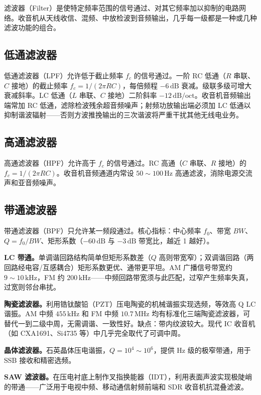 \documentclass[12pt,UTF8]{ctexbook}
\begin{document}
滤波器（Filter）是使特定频率范围的信号通过、对其它频率加以抑制的电路网络。收音机从天线收信、混频、中放检波到音频输出，几乎每一级都是一种或几种滤波功能的组合。

\subsection{低通滤波器}

低通滤波器（LPF）允许低于截止频率 $f_c$ 的信号通过。一阶 RC 低通（$R$ 串联、$C$ 接地）的截止频率 $f_c = 1/(2\pi RC)$，每倍频程 $-6\,\mathrm{dB}$ 衰减。级联多级可增大衰减斜率。LC 低通（$L$ 串联、$C$ 接地）二阶斜率 $-12\,\mathrm{dB/oct}$。收音机音频输出端常加 RC 低通，滤除检波残余超音频噪声；射频功放输出端必须加 LC 低通以抑制谐波辐射——否则方波推挽输出的三次谐波将严重干扰其他无线电业务。

\subsection{高通滤波器}

高通滤波器（HPF）允许高于 $f_c$ 的信号通过。RC 高通（$C$ 串联、$R$ 接地）的 $f_c = 1/(2\pi RC)$。收音机音频通道内常设 $50\sim100\,\mathrm{Hz}$ 高通滤波，消除电源交流声和亚音频噪声。

\subsection{带通滤波器}

带通滤波器（BPF）只允许某一频段通过。核心指标：中心频率 $f_0$、带宽 $BW$、$Q = f_0/BW$、矩形系数（$-60\,\mathrm{dB}$ 与 $-3\,\mathrm{dB}$ 带宽比，越近 1 越好）。

\textbf{LC 带通。}单调谐回路结构简单但矩形系数差（$Q$ 高则带宽窄）；双调谐回路（两回路经电容/互感耦合）矩形系数更优、通带更平坦。AM 广播信号带宽约 $9\sim10\,\mathrm{kHz}$，FM 约 $200\,\mathrm{kHz}$——中频回路带宽须与此匹配，过窄产生频率失真，过宽则邻台串扰。

\textbf{陶瓷滤波器。}利用锆钛酸铅（PZT）压电陶瓷的机械谐振实现选频，等效高 Q LC 谐振。AM 中频 $455\,\mathrm{kHz}$ 和 FM 中频 $10.7\,\mathrm{MHz}$ 均有标准化三端陶瓷滤波器，可替代一到二级中周，无需调谐、一致性好。缺点：带内纹波较大。现代 IC 收音机（如 CXA1691、Si4735 等）中几乎完全取代了可调中周。

\textbf{晶体滤波器。}石英晶体压电谐振，$Q = 10^4\sim10^6$，提供 Hz 级的极窄带通，用于 SSB 接收和精密选频。

\textbf{SAW 滤波器。}在压电衬底上制作叉指换能器（IDT），利用表面声波实现极陡峭的带通——广泛用于电视中频、移动通信射频前端和 SDR 收音机抗混叠滤波。
\end{document}
